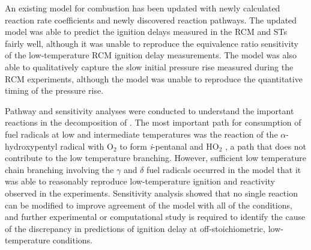 \documentclass[../main.tex]{subfiles}
\begin{document}
An existing model \cite{Tsujimura2012} for \iPeOH{} combustion has been updated with newly
calculated reaction rate coefficients and newly discovered reaction
pathways. The updated model was able to predict the ignition
delays measured in the RCM and STs fairly well, although
it was unable to reproduce the equivalence ratio sensitivity of
the low-temperature RCM ignition delay measurements. The model was
also able to qualitatively capture the slow initial pressure rise
measured during the RCM experiments, although the model was unable
to reproduce the quantitative timing of the pressure rise.

Pathway and sensitivity analyses were conducted to understand
the important reactions in the decomposition of \iPeOH{}.
The most important path for consumption of fuel radicals at low
and intermediate temperatures was the reaction of the
$\alpha$-hydroxypentyl radical with O$_2$ to form
\textit{i}-pentanal and HO$_2$ , a path that does not contribute to the
low temperature branching. However, sufficient low temperature chain
branching involving the $\gamma$ and $\delta$ fuel radicals occurred
in the model that it was able to reasonably reproduce low-temperature
ignition and reactivity observed in the experiments. Sensitivity
analysis showed that no single reaction can be modified to improve
agreement of the model with all of the conditions, and further
experimental or computational study is required to identify the
cause of the discrepancy in predictions of ignition delay
at off-stoichiometric, low-temperature conditions.
\end{document}

